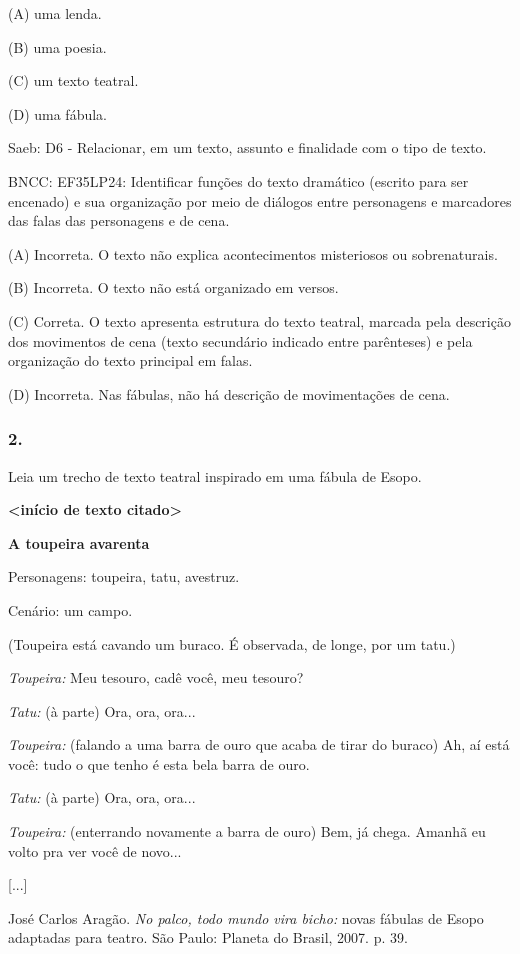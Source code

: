 (A) uma lenda.

(B) uma poesia.

(C) um texto teatral.

(D) uma fábula.

Saeb: D6 - Relacionar, em um texto, assunto e finalidade com o tipo de
texto.

BNCC: EF35LP24: Identificar funções do texto dramático (escrito para ser
encenado) e sua organização por meio de diálogos entre personagens e
marcadores das falas das personagens e de cena.

(A) Incorreta. O texto não explica acontecimentos misteriosos ou
sobrenaturais.

(B) Incorreta. O texto não está organizado em versos.

(C) Correta. O texto apresenta estrutura do texto teatral, marcada pela
descrição dos movimentos de cena (texto secundário indicado entre
parênteses) e pela organização do texto principal em falas.

(D) Incorreta. Nas fábulas, não há descrição de movimentações de cena.

\subsubsection{2. }\label{section-30}

Leia um trecho de texto teatral inspirado em uma fábula de Esopo.

\textbf{\textless{}início de texto citado\textgreater{}}

\textbf{A toupeira avarenta}

Personagens: toupeira, tatu, avestruz.

Cenário: um campo.

(Toupeira está cavando um buraco. É observada, de longe, por um tatu.)

\emph{Toupeira:} Meu tesouro, cadê você, meu tesouro?

\emph{Tatu:} (à parte) Ora, ora, ora...

\emph{Toupeira:} (falando a uma barra de ouro que acaba de tirar do
buraco) Ah, aí está você: tudo o que tenho é esta bela barra de ouro.

\emph{Tatu:} (à parte) Ora, ora, ora...

\emph{Toupeira:} (enterrando novamente a barra de ouro) Bem, já chega.
Amanhã eu volto pra ver você de novo...

{[}...{]}

José Carlos Aragão. \emph{No palco, todo mundo vira bicho:} novas
fábulas de Esopo adaptadas para teatro. São Paulo: Planeta do Brasil,
2007. p. 39.

